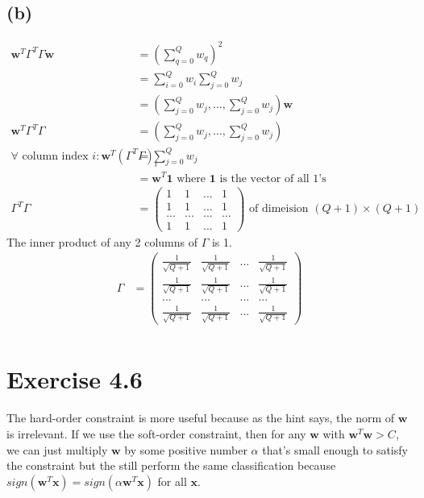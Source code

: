 \documentclass{article}
\begin{document}
	\subsection*{(b)}
		\begin{align*}
			\mathbf w^T\Gamma^T\Gamma\mathbf w &= (\sum\limits_{q = 0}^Qw_q)^2\\
			&= \sum\limits_{i = 0}^Qw_i\sum\limits_{j = 0}^Qw_j\\
			&= (\sum\limits_{j = 0}^Qw_j, ..., \sum\limits_{j = 0}^Qw_j)\mathbf w\\
			\mathbf w^T\Gamma^T\Gamma &= (\sum\limits_{j = 0}^Qw_j, ..., \sum\limits_{j = 0}^Qw_j)\\
			\forall \text{ column index } i: \mathbf w^T(\Gamma^T\Gamma)_i &= \sum\limits_{j = 0}^Qw_j\\
			&= \mathbf w^T \mathbf 1 \text{ where } \mathbf 1 \text{ is the vector of all 1's}\\
			\Gamma^T\Gamma &=
			\begin{pmatrix}
				1&1&...&1\\
				1&1&...&1\\
				...&...&...&...\\
				1&1&...&1
			\end{pmatrix}\text{ of dimeision }(Q+1)\times (Q+1)
		\end{align*}
		The inner product of any 2 columns of $\Gamma$ is 1.
		\begin{align*}
			\Gamma &= \begin{pmatrix}
				\frac1{\sqrt{Q+1}}&\frac1{\sqrt{Q+1}}&...&\frac1{\sqrt{Q+1}}\\
				\frac1{\sqrt{Q+1}}&\frac1{\sqrt{Q+1}}&...&\frac1{\sqrt{Q+1}}\\
				...&...&...&...\\
				\frac1{\sqrt{Q+1}}&\frac1{\sqrt{Q+1}}&...&\frac1{\sqrt{Q+1}}
			\end{pmatrix}\\
		\end{align*}
		
	\section*{Exercise 4.6}
		The hard-order constraint is more useful because as the hint says, the norm of $\mathbf w$ is irrelevant. If we use the soft-order constraint, then for any $\mathbf w$ with $\mathbf w^T\mathbf w > C$, we can just multiply $\mathbf w$ by some positive number $\alpha$ that's small enough to satisfy the constraint but the still perform the same classification because $sign(\mathbf w^T\mathbf x) = sign(\alpha\mathbf w^T\mathbf x)$ for all $\mathbf x$.
		
\end{document}
